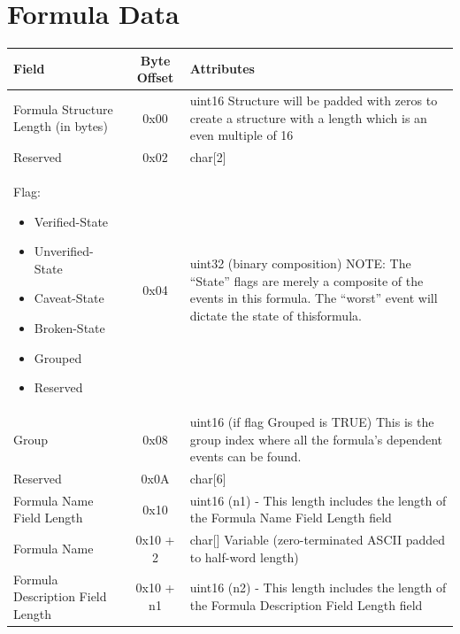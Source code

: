\documentclass[14]{article}
\begin{document}
\pagebreak

\section{Formula Data}
\begin{tabular}[l]{|p{5cm}|c|p{7cm}|}
  \hline
  \textbf{Field} & \textbf{Byte Offset} & \textbf{Attributes} \\
  \hline
  
  Formula Structure Length (in bytes) & 0x00 & uint16 Structure will be padded with
                                               zeros to create a structure with
                                               a length which is an even
                                               multiple of 16 \\ \hline
  Reserved & 0x02 & char[2] \\ \hline
  \parbox[t]{5cm} {
  Flag:
  \begin{itemize}
    \renewcommand\labelitemi{--}
    \setlength\itemsep{-0.4em}
  \item Verified-State
  \item Unverified-State
  \item Caveat-State
  \item Broken-State
  \item Grouped
  \item Reserved
  \end{itemize}
  } & 0x04 & uint32 (binary composition) NOTE: The ``State'' flags are
             merely a composite of the events in this formula. The ``worst''
             event will dictate the state of thisformula. \\ \hline
  Group & 0x08 & uint16 (if flag Grouped is TRUE) This is the group index where
                 all the formula's dependent events can be found. \\ \hline
  Reserved & 0x0A & char[6] \\ \hline
  Formula Name Field Length & 0x10 & uint16 (n1) - This length includes the
                                     length of the Formula Name Field Length
                                     field \\ \hline
  Formula Name & 0x10 + 2 & char[] Variable (zero-terminated ASCII padded to
                        half-word length) \\ \hline
  Formula Description Field Length & 0x10 + n1 & uint16 (n2) - This length
                                            includes the length of the Formula
                                            Description Field Length field \\

\end{tabular}
\end{document}
